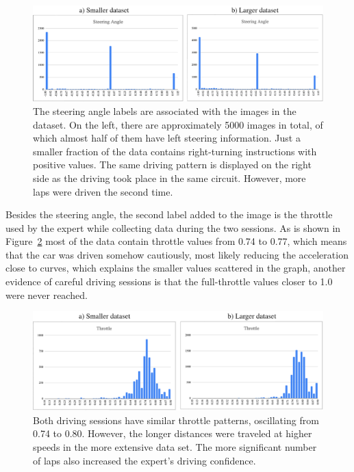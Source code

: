 \documentclass[12pt]{article}
\begin{document}
\begin{figure}[H]
\begin{center}
\includegraphics[width=1.0\textwidth]{figures/steering.png}
\caption{ The steering angle labels are associated with the images in the dataset. On the left, there are approximately 5000 images in total, of which almost half of them have left steering information. Just a smaller fraction of the data contains right-turning instructions with positive values. The same driving pattern is displayed on the right side as the driving took place in the same circuit. However, more laps were driven the second time.  }
\label{fig:steering}
\end{center}
\end{figure}

Besides the steering angle, the second label added to the image is the throttle used by the expert while collecting data during the two sessions. As is shown in Figure~\ref{fig:throttle} most of the data contain throttle values from 0.74 to 0.77, which means that the car was driven somehow cautiously, most likely reducing the acceleration close to curves, which explains the smaller values scattered in the graph, another evidence of careful driving sessions is that the full-throttle values closer to 1.0 were never reached.

\begin{figure} [H]
\begin{center}
\includegraphics[width=1.0\textwidth]{figures/throtle.png}
\caption{Both driving sessions have similar throttle patterns, oscillating from 0.74 to 0.80. However, the longer distances were traveled at higher speeds in the more extensive data set. The more significant number of laps also increased the expert's driving confidence.}
\label{fig:throttle}
\end{center}
\end{figure}
\end{document}
